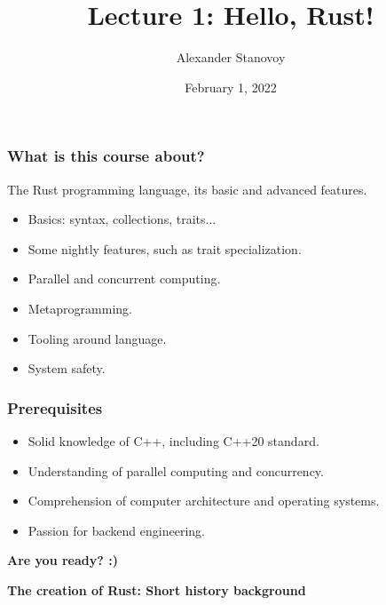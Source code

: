 \documentclass[aspectratio=1610,t]{beamer}
\title{Lecture 1: Hello, Rust!}
\date{February 1, 2022}
\author{Alexander Stanovoy}
\institute{alex.stanovoy@gmail.com}
\begin{document}

\begin{frame}
\maketitle
\end{frame}


\begin{frame}[c]
\frametitle{What is this course about?}
The Rust programming language, its basic and advanced features.
\begin{itemize}
    \item Basics: syntax, collections, traits...
    \item Some nightly features, such as trait specialization.
    \item Parallel and concurrent computing.
    \item Metaprogramming.
    \item Tooling around language.
    \item System safety.
\end{itemize}
\end{frame}


\begin{frame}[c]
\frametitle{Prerequisites}
\begin{itemize}
    \item Solid knowledge of C++, including C++20 standard.
    \item Understanding of parallel computing and concurrency.
    \item Comprehension of computer architecture and operating systems.
    \item Passion for backend engineering.
\end{itemize}
\end{frame}


\begin{frame}[c]
\centering\Huge\textbf{Are you ready? :)}
\end{frame}


\begin{frame}[c]
\centering\Huge\textbf{The creation of Rust: Short history background}
\end{frame}
\end{document}
